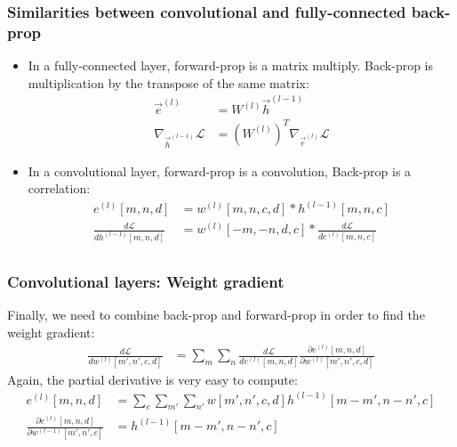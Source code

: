 \documentclass{beamer}
\begin{document}
\begin{frame}
  \frametitle{Similarities between convolutional and fully-connected back-prop}

  \begin{itemize}
  \item In a fully-connected layer, forward-prop is a matrix multiply.
    Back-prop is multiplication by the transpose of the same matrix:
    \begin{align*}
      \vec{e}^{(l)} &= W^{(l)}\vec{h}^{(l-1)}\\
      \nabla_{\vec{h}^{(l-1)}}{\mathcal L} &= \left(W^{(l)}\right)^T\nabla_{\vec{e}^{(l)}}{\mathcal L}
    \end{align*}
  \item In a convolutional layer, forward-prop is a convolution,
    Back-prop is a correlation:
    \begin{align*}
    e^{(l)}[m,n,d] &= w^{(l)}[m,n,c,d] \ast h^{(l-1)}[m,n,c]\\
    \frac{d{\mathcal L}}{dh^{(l-1)}[m,n,d]} &=
    w^{(l)}[-m,-n,d,c] \ast \frac{d{\mathcal L}}{de^{(l)}[m,n,c]}\\
    \end{align*}
  \end{itemize}
\end{frame}
    
\begin{frame}
  \frametitle{Convolutional layers: Weight gradient}

  Finally, we need to combine back-prop and forward-prop in order to
  find  the weight gradient:
  \begin{align*}
    \frac{d{\mathcal L}}{dw^{(l)}[m',n',c,d]} &=
    \sum_{m}\sum_n\frac{d{\mathcal L}}{de^{(l)}[m,n,d]}
    \frac{\partial e^{(l)}[m,n,d]}{\partial w^{(l)}[m',n',c,d]}
  \end{align*}
  Again, the partial derivative is very easy to compute:
  \begin{align*}
    e^{(l)}[m,n,d] &= \sum_c\sum_{m'}\sum_{n'} w[m',n',c,d]h^{(l-1)}[m-m',n-n',c]\\
    \frac{\partial e^{(l)}[m,n,d]}{\partial w^{(l-1)}[m',n',c]} &= h^{(l-1)}[m-m',n-n',c]
  \end{align*}
\end{frame}
\end{document}
